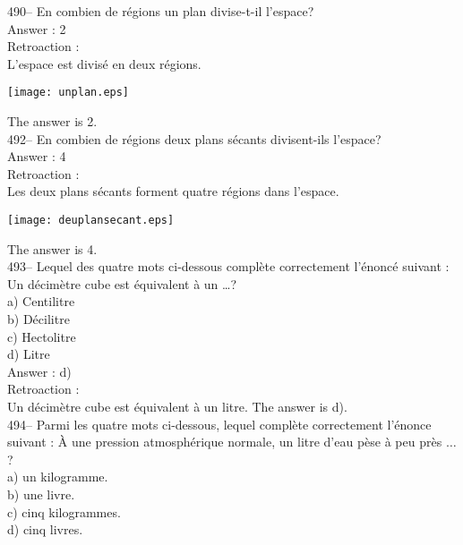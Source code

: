 ﻿\documentclass[letterpaper, 12pt]{article}
\begin{document}
490-- En combien de r\'egions un plan divise-t-il l'espace?\\

Answer : 2\\

Retroaction : \\
L'espace est divis\'e en deux r\'egions.\\
    \begin{center}
    \texttt{[image: unplan.eps]}
    \end{center}

The answer is 2.\\


492-- En combien de r\'egions deux plans s\'ecants divisent-ils l'espace?\\

Answer : 4\\

Retroaction :\\
Les deux plans s\'ecants forment quatre r\'egions dans l'espace.\\
    \begin{center}
    \texttt{[image: deuplansecant.eps]}
    \end{center}
The answer is 4.\\

493--  Lequel des quatre mots ci-dessous compl\`ete correctement
l'\'enonc\'e suivant : \og Un d\'ecim\`etre cube est \'equivalent
\`a un \ldots\fg ?\\
a) Centilitre\\
b) D\'ecilitre\\
c) Hectolitre\\
d) Litre\\

Answer : d)\\

Retroaction : \\
Un d\'ecim\`etre cube est \'equivalent \`a un litre.  The answer is d).\\

494-- Parmi les quatre mots ci-dessous, lequel compl\`ete
correctement l'\'enonce suivant : \og\`A une pression
atmosph\'erique normale, un litre d'eau p\`ese \`a peu pr\`es $\ldots$\fg ?\\
a) un kilogramme.\\
b) une livre.\\
c) cinq kilogrammes.\\
d) cinq livres.\\
\end{document}
